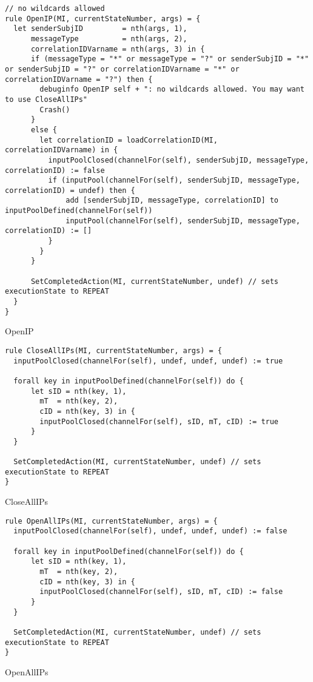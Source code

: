 \begin{listing}[H]
\begin{verbatim}
// no wildcards allowed
rule OpenIP(MI, currentStateNumber, args) = {
  let senderSubjID         = nth(args, 1),
      messageType          = nth(args, 2),
      correlationIDVarname = nth(args, 3) in {
      if (messageType = "*" or messageType = "?" or senderSubjID = "*" or senderSubjID = "?" or correlationIDVarname = "*" or correlationIDVarname = "?") then {
        debuginfo OpenIP self + ": no wildcards allowed. You may want to use CloseAllIPs"
        Crash()
      }
      else {
        let correlationID = loadCorrelationID(MI, correlationIDVarname) in {
          inputPoolClosed(channelFor(self), senderSubjID, messageType, correlationID) := false
          if (inputPool(channelFor(self), senderSubjID, messageType, correlationID) = undef) then {
              add [senderSubjID, messageType, correlationID] to inputPoolDefined(channelFor(self))
              inputPool(channelFor(self), senderSubjID, messageType, correlationID) := []
          }
        }
      }

      SetCompletedAction(MI, currentStateNumber, undef) // sets executionState to REPEAT
  }
}
\end{verbatim}
\caption{OpenIP}
\label{lst:asm:OpenIP}
\end{listing}




\begin{listing}[H]
\begin{verbatim}
rule CloseAllIPs(MI, currentStateNumber, args) = {
  inputPoolClosed(channelFor(self), undef, undef, undef) := true

  forall key in inputPoolDefined(channelFor(self)) do {
      let sID = nth(key, 1),
        mT  = nth(key, 2),
        cID = nth(key, 3) in {
        inputPoolClosed(channelFor(self), sID, mT, cID) := true
      }
  }

  SetCompletedAction(MI, currentStateNumber, undef) // sets executionState to REPEAT
}
\end{verbatim}
\caption{CloseAllIPs}
\label{lst:asm:CloseAllIPs}
\end{listing}




\begin{listing}[H]
\begin{verbatim}
rule OpenAllIPs(MI, currentStateNumber, args) = {
  inputPoolClosed(channelFor(self), undef, undef, undef) := false

  forall key in inputPoolDefined(channelFor(self)) do {
      let sID = nth(key, 1),
        mT  = nth(key, 2),
        cID = nth(key, 3) in {
        inputPoolClosed(channelFor(self), sID, mT, cID) := false
      }
  }

  SetCompletedAction(MI, currentStateNumber, undef) // sets executionState to REPEAT
}
\end{verbatim}
\caption{OpenAllIPs}
\label{lst:asm:OpenAllIPs}
\end{listing}




